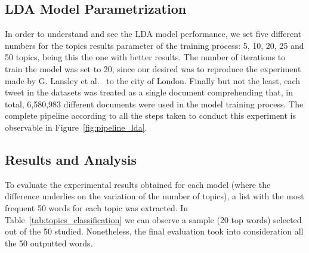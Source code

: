 \subsection{LDA Model Parametrization}
In order to understand and see the LDA model performance, we set five different numbers for the topics results parameter of the training process: 5, 10, 20, 25 and 50 topics, being this the one with better results. The number of iterations to train the model was set to 20, since our desired was to reproduce the experiment made by G. Lansley et al.~\cite{lansley2016geography} to the city of London. Finally but not the least, each tweet in the datasets was treated as a single document comprehending that, in total, 6,580,983 different documents were used in the model training process. The complete pipeline according to all the steps taken to conduct this experiment is observable in Figure~\ref{fig:pipeline_lda}.

\subsection{Results and Analysis}
To evaluate the experimental results obtained for each model (where the difference underlies on the variation of the number of topics), a list with the most frequent 50 words for each topic was extracted. In Table~\ref{tab:topics_classification} we can observe a sample (20 top words) selected out of the 50 studied. Nonetheless, the final evaluation took into consideration all the  50 outputted words.
	
